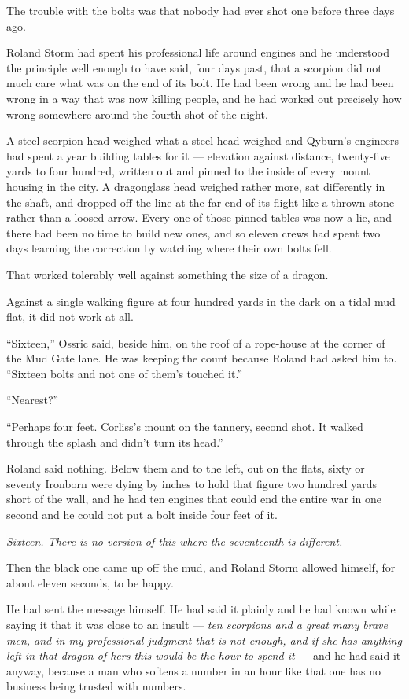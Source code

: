 The trouble with the bolts was that nobody had ever shot one before three days ago.

Roland Storm had spent his professional life around engines and he understood the principle well enough to have said, four days past, that a scorpion did not much care what was on the end of its bolt. He had been wrong and he had been wrong in a way that was now killing people, and he had worked out precisely how wrong somewhere around the fourth shot of the night.

A steel scorpion head weighed what a steel head weighed and Qyburn’s engineers had spent a year building tables for it — elevation against distance, twenty-five yards to four hundred, written out and pinned to the inside of every mount housing in the city. A dragonglass head weighed rather more, sat differently in the shaft, and dropped off the line at the far end of its flight like a thrown stone rather than a loosed arrow. Every one of those pinned tables was now a lie, and there had been no time to build new ones, and so eleven crews had spent two days learning the correction by watching where their own bolts fell.

That worked tolerably well against something the size of a dragon.

Against a single walking figure at four hundred yards in the dark on a tidal mud flat, it did not work at all.

“Sixteen,” Ossric said, beside him, on the roof of a rope-house at the corner of the Mud Gate lane. He was keeping the count because Roland had asked him to. “Sixteen bolts and not one of them’s touched it.”

“Nearest?”

“Perhaps four feet. Corliss’s mount on the tannery, second shot. It walked through the splash and didn’t turn its head.”

Roland said nothing. Below them and to the left, out on the flats, sixty or seventy Ironborn were dying by inches to hold that figure two hundred yards short of the wall, and he had ten engines that could end the entire war in one second and he could not put a bolt inside four feet of it.

\textit{Sixteen. There is no version of this where the seventeenth is different.}

\sceneBreak

Then the black one came up off the mud, and Roland Storm allowed himself, for about eleven seconds, to be happy.

He had sent the message himself. He had said it plainly and he had known while saying it that it was close to an insult — \textit{ten scorpions and a great many brave men, and in my professional judgment that is not enough, and if she has anything left in that dragon of hers this would be the hour to spend it} — and he had said it anyway, because a man who softens a number in an hour like that one has no business being trusted with numbers.

